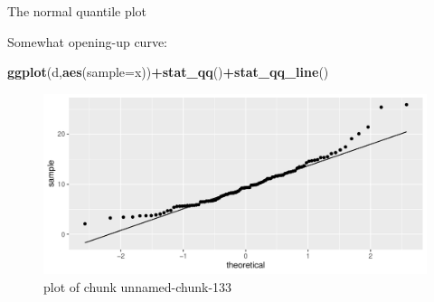 \documentclass[
  ignorenonframetext,
]{beamer}
\newenvironment{Shaded}{\begin{snugshade}}{\end{snugshade}}
\newcommand{\DataTypeTok}[1]{\textcolor[rgb]{0.13,0.29,0.53}{#1}}
\newcommand{\KeywordTok}[1]{\textcolor[rgb]{0.13,0.29,0.53}{\textbf{#1}}}
\newcommand{\NormalTok}[1]{#1}
\newcommand{\OperatorTok}[1]{\textcolor[rgb]{0.81,0.36,0.00}{\textbf{#1}}}
\begin{document}
\begin{frame}[fragile]{The normal quantile plot}
\protect\hypertarget{the-normal-quantile-plot-3}{}

Somewhat opening-up curve:

\begin{Shaded}
\begin{Highlighting}[]
\KeywordTok{ggplot}\NormalTok{(d,}\KeywordTok{aes}\NormalTok{(}\DataTypeTok{sample=}\NormalTok{x))}\OperatorTok{+}\KeywordTok{stat_qq}\NormalTok{()}\OperatorTok{+}\KeywordTok{stat_qq_line}\NormalTok{()}
\end{Highlighting}
\end{Shaded}

\begin{figure}
\centering
\includegraphics{figure/unnamed-chunk-133-1.pdf}
\caption{plot of chunk unnamed-chunk-133}
\end{figure}

\end{frame}
\end{document}
